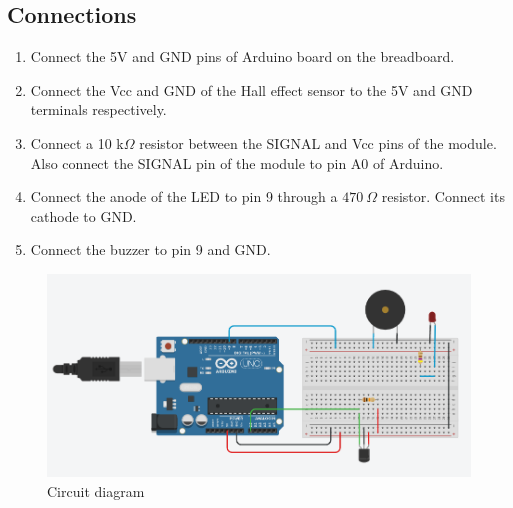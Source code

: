 \subsection*{Connections}
\begin{enumerate}[leftmargin=*]
    \item Connect the 5V and GND pins of Arduino board on the breadboard.
    \item Connect the Vcc and GND of the Hall effect sensor to the 5V and GND terminals respectively. 
    \item Connect a 10 k$\Omega$ resistor between the SIGNAL and Vcc pins of the module. Also connect the SIGNAL pin of the module to pin A$0$ of Arduino.
    \item Connect the anode of the LED to pin 9 through a $470~ \Omega$ resistor. Connect its cathode to GND.
    \item Connect the buzzer to pin 9 and GND.
    
\end{enumerate}

\begin{figure}[H]
    \centering
    \includegraphics[scale=0.5]{Figures/magnetism.PNG}
    \caption{Circuit diagram}
\end{figure}

